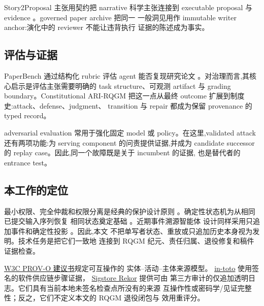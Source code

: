 Story2Proposal 主张用契约把 narrative 科学主张连接到 executable proposal
与 evidence \cite{qian2026story2proposal}。governed paper archive 把同一
一般洞见用作 immutable writer anchor:演化中的 reviewer 不能让违背执行
证据的陈述成为事实。

\subsection{评估与证据}\label{sec:related:eval}

PaperBench 通过结构化 rubric 评估 agent 能否复现研究论文
\cite{starace2025paperbench}。对治理而言,其核心启示是评估主张需要明确的
task structure、可观测 artifact 与 grading boundary。Constitutional
ARI-RQGM 把这一点从最终 outcome 扩展到制度史:attack、defense、judgment、
transition 与 repair 都成为保留 provenance 的 typed record。

adversarial evaluation 常用于强化固定 model 或 policy。在这里,validated
attack 还有两项功能:为 serving component 的问责提供证据,并成为 candidate
successor 的 replay case。因此,同一个故障既是关于 incumbent 的证据,
也是替代者的 entrance test。

\subsection{本工作的定位}\label{sec:related:foundations}

最小权限、完全仲裁和权限分离是经典的保护设计原则
\cite{saltzer1975protection}。确定性状态机为从相同已提交输入序列恢复
相同状态奠定基础 \cite{schneider1990implementing}。近期事件溯源智能体
设计同样采用只追加事件和确定性投影 \cite{nakajima2026the}。因此,本文
不把单写者状态、重放或只追加历史本身视为发明。技术任务是把它们一致地
连接到 RQGM 纪元、责任归属、退役修复和稿件证据检查。

\href{https://www.w3.org/TR/prov-o/}{W3C PROV-O 建议书}规定可互操作的
实体--活动--主体来源模型。
\href{https://www.usenix.org/conference/usenixsecurity19/presentation/torres-arias}{in-toto}
使用签名的软件供应链步骤证据，
\href{https://docs.sigstore.dev/logging/overview/}{Sigstore Rekor} 提供可由
第三方审计的仅追加透明日志。它们具有当前本地未签名检查点所没有的来源
互操作性或密码学/见证完整性；反之，它们不定义本文的 RQGM 退役闭包与
效用重评分。

